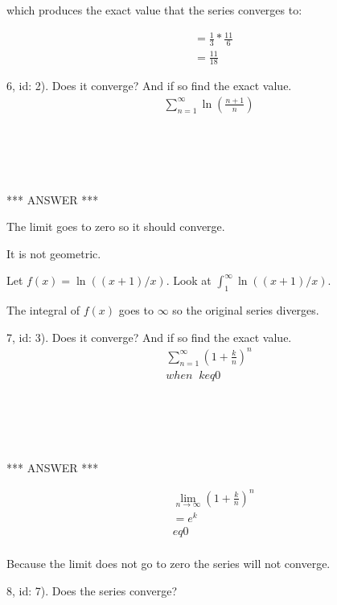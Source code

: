 \documentclass[fleqn]{article}
\begin{document}
which produces the exact value that the series converges to:

\begin{align*}
&= \frac{1}{3}*\frac{11}{6}\\
&= \frac{11}{18}
\end{align*}


6, id: 2).  Does it converge?  And if so find the exact value.\\

\begin{align*}
\sum_{n=1}^{\infty} \ln(\frac{n+1}{n})
\end{align*}


\begin{verbatim}





\end{verbatim}

*** ANSWER ***


The limit goes to zero so it should converge.

It is not geometric.

Let $f(x) = \ln((x+1)/x)$.
Look at $\int_{1}^{\infty} \ln((x+1)/x)$.

The integral of $f(x)$ goes to $\infty$ so the original series diverges.

7, id: 3).  Does it converge?  And if so find the exact value.\\

\begin{align*}
\sum_{n=1}^{\infty} \left(1+\frac{k}{n}\right)^{n}\\
when \;\; k 
eq 0
\end{align*}


\begin{verbatim}





\end{verbatim}

*** ANSWER ***


\begin{align*}
& \lim_{n \rightarrow \infty} \left(1+\frac{k}{n}\right)^{n}\\
&= e^k\\
&
eq 0\\
\end{align*}

Because the limit does not go to zero the series will not converge.


8, id: 7).  Does the series converge?\\
\end{document}
